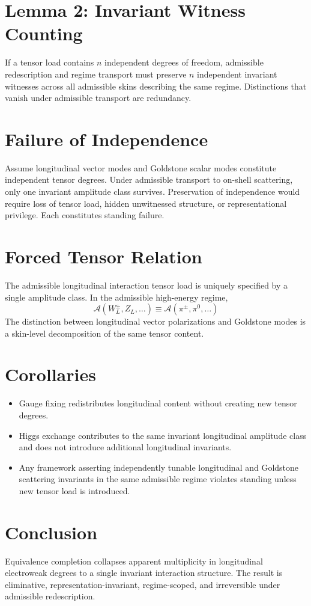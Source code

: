 ﻿\documentclass[11pt]{article}
\begin{document}
\section{Lemma 2: Invariant Witness Counting}
If a tensor load contains $n$ independent degrees of freedom, admissible redescription and regime transport must preserve $n$ independent invariant witnesses across all admissible skins describing the same regime. Distinctions that vanish under admissible transport are redundancy.

\section{Failure of Independence}
Assume longitudinal vector modes and Goldstone scalar modes constitute independent tensor degrees. Under admissible transport to on-shell scattering, only one invariant amplitude class survives. Preservation of independence would require loss of tensor load, hidden unwitnessed structure, or representational privilege. Each constitutes standing failure.

\section{Forced Tensor Relation}
The admissible longitudinal interaction tensor load is uniquely specified by a single amplitude class. In the admissible high-energy regime,
\begin{equation}
\boxed{\;
\mathcal{A}(W_L^\pm, Z_L,\ldots)
\equiv
\mathcal{A}(\pi^\pm, \pi^0,\ldots)
\;}
\end{equation}
The distinction between longitudinal vector polarizations and Goldstone modes is a skin-level decomposition of the same tensor content.

\section{Corollaries}
\begin{itemize}
\item Gauge fixing redistributes longitudinal content without creating new tensor degrees.
\item Higgs exchange contributes to the same invariant longitudinal amplitude class and does not introduce additional longitudinal invariants.
\item Any framework asserting independently tunable longitudinal and Goldstone scattering invariants in the same admissible regime violates standing unless new tensor load is introduced.
\end{itemize}

\section*{Conclusion}
Equivalence completion collapses apparent multiplicity in longitudinal electroweak degrees to a single invariant interaction structure. The result is eliminative, representation-invariant, regime-scoped, and irreversible under admissible redescription.
\end{document}
